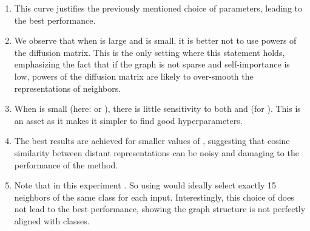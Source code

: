 \documentclass[a4paper,conference]{IEEEtran}
\begin{document}
\begin{enumerate}
    \item This curve justifies the previously mentioned choice of parameters, leading to the best performance.
    \item We observe that when  is large and  is small, it is better not to use powers of the diffusion matrix. This is the only setting where this statement holds, emphasizing the fact that if the graph is not sparse and self-importance is low, powers of the diffusion matrix are likely to over-smooth the representations of neighbors.
    \item When  is small (here:  or ), there is little sensitivity to both  and  (for ). This is an asset as it makes it simpler to find good hyperparameters.
    \item The best results are achieved for smaller values of , suggesting that cosine similarity between distant representations can be noisy and damaging to the performance of the method.
    \item Note that in this experiment . So using  would ideally select exactly 15 neighbors of the same class for each input. Interestingly, this choice of  does not lead to the best performance, showing the graph structure is not perfectly aligned with classes.
\end{enumerate}
\end{document}

